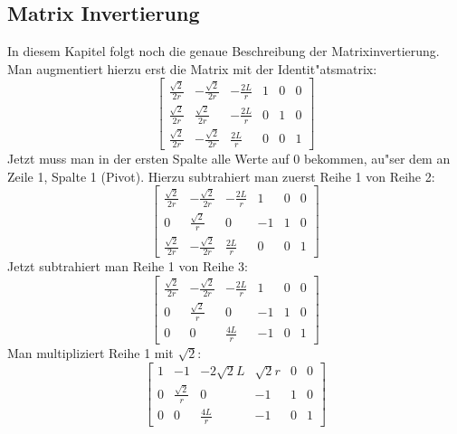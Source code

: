 \documentclass[11pt]{article}
\begin{document}
    \subsection{Matrix Invertierung}\label{subsec:matrxinv}
    In diesem Kapitel folgt noch die genaue Beschreibung der Matrixinvertierung.
    Man augmentiert hierzu erst die Matrix mit der Identit"atsmatrix:
    \begin{equation}
        \left[\begin{array}{ccc|ccc}
                  \frac{\sqrt{2}}{2r} & -\frac{\sqrt{2}}{2r} & -\frac{2L}{r} & 1 & 0 & 0 \\
                  \frac{\sqrt{2}}{2r} & \frac{\sqrt{2}}{2r}  & -\frac{2L}{r} & 0 & 1 & 0 \\
                  \frac{\sqrt{2}}{2r} & -\frac{\sqrt{2}}{2r} & \frac{2L}{r}  & 0 & 0 & 1
        \end{array}\right]\label{eq:startinv}
    \end{equation}
    Jetzt muss man in der ersten Spalte alle Werte auf 0 bekommen, au"ser dem an Zeile 1, Spalte 1 (Pivot).
    Hierzu subtrahiert man zuerst Reihe 1 von Reihe 2:
    \begin{equation}
        \left[\begin{array}{ccc|ccc}
                  \frac{\sqrt{2}}{2r} & -\frac{\sqrt{2}}{2r} & -\frac{2L}{r} & 1  & 0 & 0 \\
                  0                   & \frac{\sqrt{2}}{r}   & 0             & -1 & 1 & 0 \\
                  \frac{\sqrt{2}}{2r} & -\frac{\sqrt{2}}{2r} & \frac{2L}{r}  & 0  & 0 & 1
        \end{array}\right]\label{eq:equationr1addr3}
    \end{equation}
    Jetzt subtrahiert man Reihe 1 von Reihe 3:
    \begin{equation}
        \left[\begin{array}{ccc|ccc}
                  \frac{\sqrt{2}}{2r} & -\frac{\sqrt{2}}{2r} & -\frac{2L}{r} & 1  & 0 & 0 \\
                  0                   & \frac{\sqrt{2}}{r}   & 0             & -1 & 1 & 0 \\
                  0                   & 0                    & \frac{4L}{r}  & -1 & 0 & 1
        \end{array}\right]\label{eq:invr3tor1}
    \end{equation}
    Man multipliziert Reihe 1 mit $\sqrt{2}$:
    \begin{equation}
        \left[\begin{array}{ccc|ccc}
                  1 & -1                 & -2\sqrt{2}L  & \sqrt{2}r & 0 & 0 \\
                  0 & \frac{\sqrt{2}}{r} & 0            & -1        & 1 & 0 \\
                  0 & 0                  & \frac{4L}{r} & -1        & 0 & 1
        \end{array}\right]\label{eq:invsqrtmult}
    \end{equation}
\end{document}
